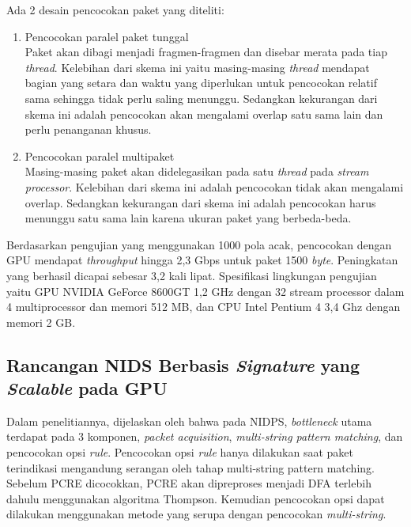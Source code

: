    Ada 2 desain pencocokan paket yang diteliti:
    \begin{enumerate}

      \item Pencocokan paralel paket tunggal \\
      Paket akan dibagi menjadi fragmen-fragmen dan disebar merata pada tiap \emph{thread}. Kelebihan dari skema ini yaitu masing-masing \emph{thread} mendapat bagian yang setara dan waktu yang diperlukan untuk pencocokan relatif sama sehingga tidak perlu saling menunggu. Sedangkan kekurangan dari skema ini adalah pencocokan akan mengalami overlap satu sama lain dan perlu penanganan khusus.

      \item Pencocokan paralel multipaket \\
      Masing-masing paket akan didelegasikan pada satu \emph{thread} pada \emph{stream processor}. Kelebihan dari skema ini adalah pencocokan tidak akan mengalami overlap. Sedangkan kekurangan dari skema ini adalah pencocokan harus menunggu satu sama lain karena ukuran paket yang berbeda-beda.

    \end{enumerate}

    Berdasarkan pengujian yang menggunakan 1000 pola acak, pencocokan dengan GPU mendapat \emph{throughput} hingga 2,3 Gbps untuk paket 1500 \emph{byte}. Peningkatan yang berhasil dicapai sebesar 3,2 kali lipat. Spesifikasi lingkungan pengujian yaitu GPU NVIDIA GeForce 8600GT 1,2 GHz dengan 32 stream processor dalam 4 multiprocessor dan memori 512 MB, dan CPU Intel Pentium 4 3,4 Ghz dengan memori 2 GB.

  \subsection{Rancangan NIDS Berbasis \emph{Signature} yang \emph{Scalable} pada GPU}

    Dalam penelitiannya, dijelaskan oleh \citep{kargus2012} bahwa pada NIDPS, \emph{bottleneck} utama terdapat pada 3 komponen, \emph{packet acquisition}, \emph{multi-string pattern matching}, dan pencocokan opsi \emph{rule}. Pencocokan opsi \emph{rule} hanya dilakukan saat paket terindikasi mengandung serangan oleh tahap multi-string pattern matching. Sebelum PCRE dicocokkan, PCRE akan dipreproses menjadi DFA terlebih dahulu menggunakan algoritma Thompson. Kemudian pencocokan opsi dapat dilakukan menggunakan metode yang serupa dengan pencocokan \emph{multi-string}.

